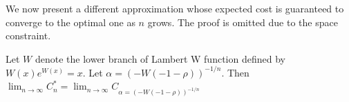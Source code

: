 
We now present a different approximation whose expected cost is guaranteed
to converge to the optimal one as $n$ grows.  The proof is omitted due to
the space constraint.

\begin{theorem}\label{theorem:approx1}
Let $W$ denote the lower branch of Lambert W function defined by $W(x) e^{W(x)} = x$.
Let $\alpha = (-W(-1-\rho))^{-1/n}$.  Then 
$\lim_{n \rightarrow \infty} C^*_n = \lim_{n \rightarrow \infty} C_{\alpha = (-W(-1-\rho))^{-1/n}}$
\end{theorem}


